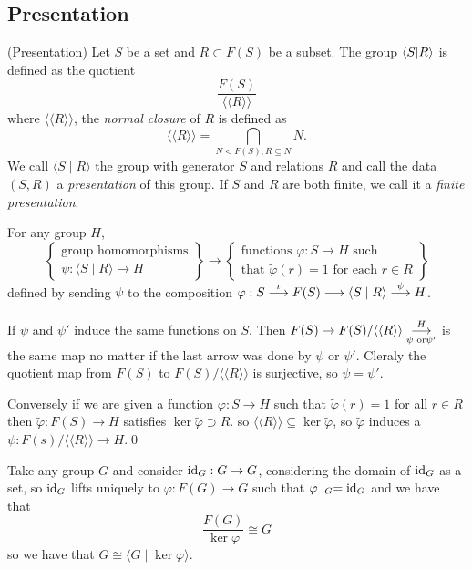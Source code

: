 \documentclass{article}
\begin{document}
\subsection{Presentation}
\begin{definition}
	(Presentation) Let $ S $ be a set and $ R\subset F(S) $ be a subset. The group $ \bra{S}\ket{R} $ is defined as the quotient 
	\[
		\frac{F(S)}{\langle\langle R\rangle\rangle}
	\]
	where $ \langle\langle R \rangle\rangle $, the \textit{normal closure} of $ R $ is defined as
	\[
		\langle\langle R \rangle\rangle = \bigcap_{N\triangleleft  F(S), R\subseteq N} N. 
	\]
	We call $ \langle S \mid R\rangle $ the group with generator $ S $ and relations $ R $ and call the data $ (S,R) $ a \textit{presentation} of this group. If $ S $ and $ R $ are both finite, we call it a \textit{finite presentation}.
\end{definition}
\begin{lemma}
  For any group $ H $,
  \[
\left\{ \begin{array}{c} \text{group homomorphisms} \\ \psi : \langle S \mid R \rangle \to H \end{array} \right\}
\longrightarrow
\left\{ \begin{array}{c} \text{functions } \varphi : S \to H \text{ such} \\ \text{that } \tilde\varphi(r) = 1 \text{ for each } r \in R \end{array} \right\}
\]
defined by sending $ \psi $ to the composition $ \varphi: S \arr{}{\iota} F(S) \arr{}{} \langle S \mid R \rangle \arr{}\psi H $.
\end{lemma}
\pf If $ \psi $ and $ \psi' $ induce the same functions on $ S $. Then $ F(S) \to F(S)/\langle\langle R\rangle\rangle\arr{\psi \text{ or} \psi'} H $ is the same map no matter if the last arrow was done by $ \psi $ or $ \psi' $. Cleraly the quotient map from $ F(S) $ to $ F(S)/\langle\langle R\rangle\rangle $ is surjective, so $ \psi=\psi' $.
\par
Conversely if we are given a function $ \varphi: S \to H $ such that $ \tilde \varphi(r) = 1 $ for all $ r\in R $ then $ \tilde \varphi: F(S) \to H $ satisfies $ \ker\tilde\varphi \supset R $. so $ \langle\langle R \rangle \rangle \subseteq \ker \tilde \varphi $, so $ \tilde \varphi $ induces a $ \psi: F(s)/\langle\langle R \rangle\rangle \to H $.\qed
\begin{example}
  Take any group $ G $ and consider $ \id_G: G \to G $, considering the domain of $ \id_G $ as a set, so $ \id_G $ lifts uniquely to $ \varphi: F(G) \to G $ such that $ \varphi\mid_G = \id_G $ and we have that 
  \[
	  \frac{F(G)}{\ker \varphi} \cong G
  \]
  so we have that $ G\cong \langle G \mid \ker \varphi\rangle $.
\end{example}
\end{document}
